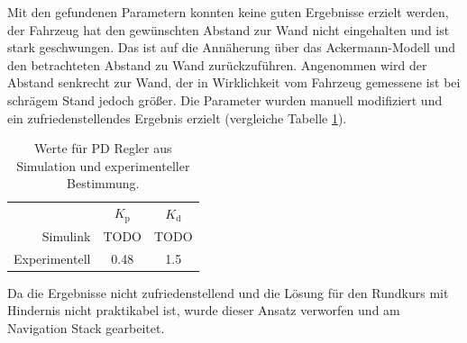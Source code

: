 Mit den gefundenen Parametern konnten keine guten Ergebnisse erzielt werden, der Fahrzeug hat den gew\"unschten Abstand zur Wand nicht eingehalten und ist stark geschwungen. Das ist auf die Ann\"aherung \"uber das Ackermann-Modell und den betrachteten Abstand zu Wand zur\"uckzuf\"uhren. Angenommen wird der Abstand senkrecht zur Wand, der in Wirklichkeit vom Fahrzeug gemessene ist bei schr\"agem Stand jedoch gr\"o\ss{}er. Die Parameter wurden manuell modifiziert und ein zufriedenstellendes Ergebnis erzielt (vergleiche Tabelle \ref{tab:PD}).

\begin{table}[h]
	\centering
	\begin{tabular}{rcc}
		 & $K_\text{p}$ & $K_\text{d}$ \\ 
		Simulink & TODO & TODO \\ 
		Experimentell & 0.48 & 1.5
	\end{tabular}
	\caption{Werte f\"ur PD Regler aus Simulation und experimenteller Bestimmung.}
	\label{tab:PD}
\end{table}

Da die Ergebnisse nicht zufriedenstellend und die L\"osung f\"ur den Rundkurs mit Hindernis nicht praktikabel ist, wurde dieser Ansatz verworfen und am Navigation Stack gearbeitet.
